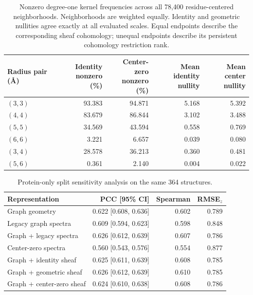 \begin{table}[htbp]\centering\small
\caption{Nonzero degree-one kernel frequencies across all 78,400 residue-centered neighborhoods. Neighborhoods are weighted equally. Identity and geometric nullities agree exactly at all evaluated scales. Equal endpoints describe the corresponding sheaf cohomology; unequal endpoints describe its persistent cohomology restriction rank.}
\begin{tabular}{lrrrr}\toprule
Radius pair (\AA) & \shortstack{Identity\\nonzero (\%)} & \shortstack{Center-zero\\nonzero (\%)} & \shortstack{Mean identity\\nullity} & \shortstack{Mean center\\nullity}\\\midrule
$(3,3)$ & 93.383 & 94.871 & 5.168 & 5.392 \\
$(4,4)$ & 83.679 & 86.844 & 3.102 & 3.488 \\
$(5,5)$ & 34.569 & 43.594 & 0.558 & 0.769 \\
$(6,6)$ & 3.221 & 6.657 & 0.039 & 0.080 \\
$(3,4)$ & 28.578 & 36.213 & 0.360 & 0.481 \\
$(5,6)$ & 0.361 & 2.140 & 0.004 & 0.022 \\
\bottomrule\end{tabular}\end{table}




\begin{table}[htbp]\centering\small
\caption{Protein-only split sensitivity analysis on the same 364 structures.}
\begin{tabular}{lrrr}\toprule
Representation & PCC [95\% CI] & Spearman & RMSE$_z$\\\midrule
Graph geometry & 0.622 [0.608, 0.636] & 0.602 & 0.789 \\
Legacy graph spectra & 0.609 [0.594, 0.623] & 0.598 & 0.848 \\
Graph + legacy spectra & 0.626 [0.612, 0.639] & 0.607 & 0.786 \\
Center-zero spectra & 0.560 [0.543, 0.576] & 0.554 & 0.877 \\
Graph + identity sheaf & 0.625 [0.611, 0.639] & 0.608 & 0.785 \\
Graph + geometric sheaf & 0.626 [0.612, 0.639] & 0.610 & 0.785 \\
Graph + center-zero sheaf & 0.624 [0.610, 0.638] & 0.608 & 0.786 \\
\bottomrule\end{tabular}\end{table}



